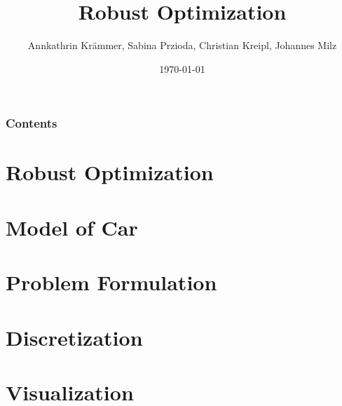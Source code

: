 \documentclass{beamer}
\title{Robust Optimization}
\author{Annkathrin Kr\"{a}mmer, Sabina Przioda, Christian Kreipl, Johannes Milz}
\date{\today}
\institute{Technische Universit\"{a}t M\"{u}nchen}
\begin{document}
\maketitle



\begin{frame}
\frametitle{Contents}
\tableofcontents
\end{frame}



\section{Robust Optimization}




\section{Model of Car}




\section{Problem Formulation}




\section{Discretization}






\section{Visualization}






\end{document}
